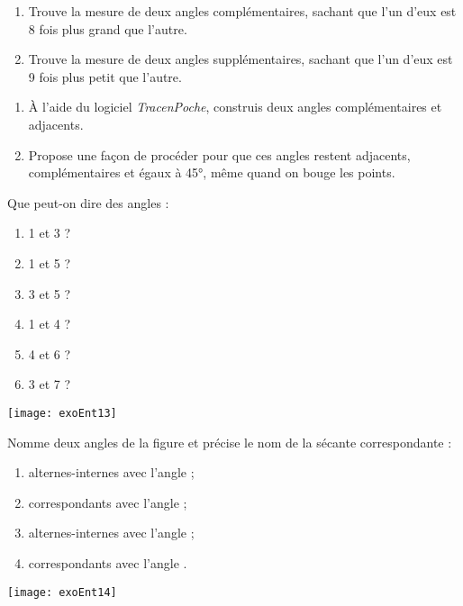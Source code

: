 \begin{exercice}
\begin{enumerate}
\item Trouve la mesure de deux angles complémentaires, sachant que l'un d'eux est 8 fois plus grand que l'autre.
\item Trouve la mesure de deux angles supplémentaires, sachant que l'un d'eux est 9 fois plus petit que l'autre.
\end{enumerate}
\end{exercice}



\begin{exercice}
\begin{enumerate}
\item À l'aide du logiciel \emph{TracenPoche}, construis deux angles complémentaires et adjacents.
\item Propose une façon de procéder pour que ces angles restent adjacents, complémentaires et égaux à 45°, même quand on bouge les points.
\end{enumerate}
\end{exercice}



\begin{exercice}
Que peut-on dire des angles :

\begin{minipage}{.3\linewidth}
\begin{enumerate}
\item 1 et 3 ?
\item 1 et 5 ?
\item 3 et 5 ?
\item 1 et 4 ?
\item 4 et 6 ?
\item 3 et 7 ?
\end{enumerate}
\end{minipage}\hfill%
\begin{minipage}{.67\linewidth}
\centering
\texttt{[image: exoEnt13]}
\end{minipage}
\end{exercice}




\begin{exercice}
Nomme deux angles de la figure et précise le nom de la sécante correspondante :
\begin{enumerate}
\item alternes-internes avec l'angle  ;
\item correspondants avec l'angle  ;
\item alternes-internes avec l'angle  ;
\item correspondants avec l'angle .
\end{enumerate}

\begin{center}
    \texttt{[image: exoEnt14]}
\end{center}

\end{exercice}



